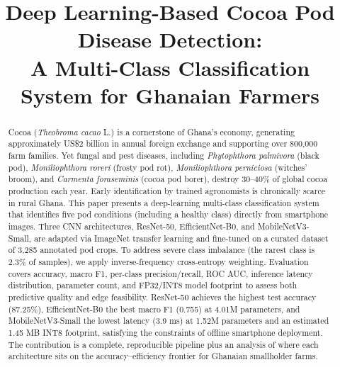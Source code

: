 \documentclass[conference,10pt]{IEEEtran}
\begin{document}
\title{Deep Learning-Based Cocoa Pod Disease Detection:\\
A Multi-Class Classification System for Ghanaian Farmers}

\author{
}

\maketitle

\begin{abstract}
Cocoa (\textit{Theobroma cacao} L.) is a cornerstone of Ghana's economy,
generating approximately US\$2 billion in annual foreign exchange and supporting
over 800{,}000 farm families. Yet fungal and pest diseases, including
\textit{Phytophthora palmivora} (black pod), \textit{Moniliophthora roreri}
(frosty pod rot), \textit{Moniliophthora perniciosa} (witches' broom), and
\textit{Carmenta foraseminis} (cocoa pod borer), destroy 30--40\% of global
cocoa production each year. Early identification by trained agronomists is
chronically scarce in rural Ghana. This paper presents a deep-learning
multi-class classification system that identifies five pod conditions
(including a healthy class) directly from smartphone images. Three CNN
architectures, ResNet-50, EfficientNet-B0, and MobileNetV3-Small, are
adapted via ImageNet transfer learning and fine-tuned on a curated dataset of
3{,}285 annotated pod crops. To address severe class imbalance (the rarest
class is 2.3\% of samples), we apply inverse-frequency cross-entropy weighting.
Evaluation covers accuracy, macro F1, per-class precision/recall, ROC AUC,
inference latency distribution, parameter count, and FP32/INT8 model footprint
to assess both predictive quality and edge feasibility. ResNet-50 achieves the
highest test accuracy (87.25\%), EfficientNet-B0 the best macro F1 (0.755) at
4.01M parameters, and MobileNetV3-Small the lowest latency (3.9 ms) at 1.52M
parameters and an estimated 1.45 MB INT8 footprint, satisfying the constraints
of offline smartphone deployment. The contribution is a complete, reproducible
pipeline plus an analysis of where each architecture sits on the
accuracy--efficiency frontier for Ghanaian smallholder farms.
\end{abstract}
\end{document}

